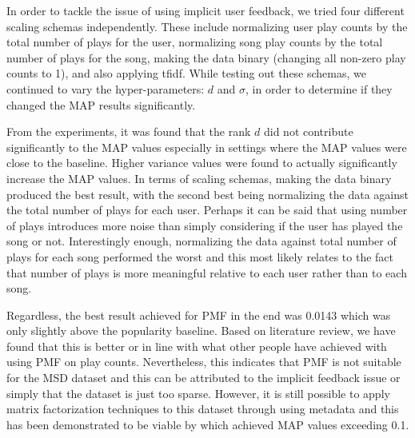 \documentclass[12pt,preprint]{aastex}
\begin{document}
In order to tackle the issue of using implicit user feedback, we tried four different scaling schemas independently. These include normalizing user play counts by the total number of plays for the user, normalizing song play counts by the total number of plays for the song, making the data binary (changing all non-zero play counts to 1), and also applying tfidf. While testing out these schemas, we continued to vary the hyper-parameters: $d$ and $\sigma$, in order to determine if they changed the MAP results significantly. 
 
From the experiments, it was found that the rank $d$ did not contribute significantly to the MAP values especially in settings where the MAP values were close to the baseline. Higher variance values were found to actually significantly increase the MAP values. In terms of scaling schemas, making the data binary produced the best result, with the second best being normalizing the data against the total number of plays for each user. Perhaps it can be said that using number of plays introduces more noise than simply considering if the user has played the song or not. Interestingly enough, normalizing the data against total number of plays for each song performed the worst and this most likely relates to the fact that number of plays is more meaningful relative to each user rather than to each song.
 
Regardless, the best result achieved for PMF in the end was 0.0143 which was only slightly above the popularity baseline. Based on literature review, we have found that this is better or in line with what other people have achieved with using PMF on play counts. Nevertheless, this indicates that PMF is not suitable for the MSD dataset and this can be attributed to the implicit feedback issue or simply that the dataset is just too sparse. However, it is still possible to apply matrix factorization techniques to this dataset through using metadata and this has been demonstrated to be viable by \citet{li2012million} which achieved MAP values exceeding 0.1.  





%
\end{document}

